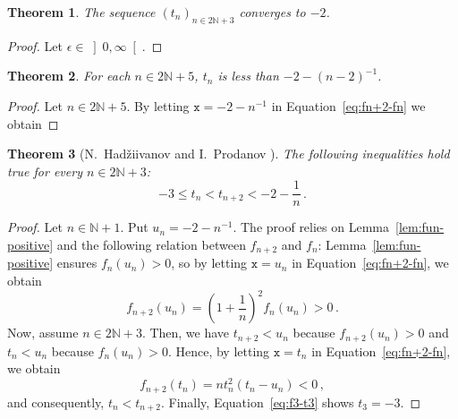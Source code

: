 \documentclass[12pt]{article}
\newcommand{\bN}{\mathbb{N}}
\newcommand{\gtint}[1]{\left] #1, \infty \right[}
\newcommand{\ttx}{\mathtt{x}}
\newtheorem{theorem}{Theorem}
\begin{document}
 \begin{theorem}
   The sequence $\left( t_n \right)_{n \in 2 \bN + 3}$ converges to $- 2$.
 \end{theorem}

 \begin{proof}
   Let $\epsilon \in \gtint{0}$.
 \end{proof}

\begin{theorem}
  For each $n \in 2 \bN + 5$, $t_n$ is less than $- 2 - {(n - 2)}^{-1}$.
\end{theorem}

\begin{proof}
  Let $n \in 2 \bN + 5$.
  By letting $\ttx = - 2 - n^{-1}$ in Equation~\eqref{eq:fn+2-fn} we obtain
\end{proof}



 
 \begin{theorem}[N.~Had\v{z}iivanov and I.~Prodanov \cite{MitrinovicAI,MitrinovicCNIA,MondP94,MitrinovicP93}] \label{thm:bulgare}
   The following inequalities hold true for every $n \in 2 \bN + 3$:
   $$
   - 3 \le t_n < t_{n + 2} < - 2 - \frac{1}{n} \,.
   $$
 \end{theorem}
 
 \begin{proof}
   Let $n \in \bN + 1$.
   Put $u_n = - 2 - n^{-1}$.
   The proof relies on Lemma~\ref{lem:fun-positive} and the following relation between $f_{n + 2}$ and $f_n$:
 Lemma~\ref{lem:fun-positive} ensures $f_n(u_n) > 0$,
 so by letting  $\ttx = u_n$ in Equation~\eqref{eq:fn+2-fn},
 we obtain
 $$
   f_{n + 2} (u_n)  = {\left(1 + \frac{1}{n} \right)}^2 f_n(u_n) > 0 \, .
  $$
  Now, assume $n \in 2 \bN + 3$.
  Then, we have
  $t_{n + 2} < u_n$ because $f_{n + 2}(u_n) > 0$
  and
  $t_n < u_n$ because $f_n(u_n) > 0$.
   Hence, by letting $\ttx = t_n$ in Equation~\eqref{eq:fn+2-fn},
   we obtain
   $$
   f_{n + 2} (t_n)  = n t_n^2 (t_n - u_n) < 0 \,, 
   $$
   and consequently, $t_n < t_{n + 2}$.
   Finally, Equation~\eqref{eq:f3-t3} shows $t_3 = - 3$.
 \end{proof}   

 
  
\end{document}
